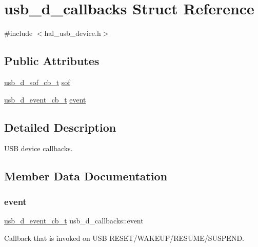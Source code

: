 \hypertarget{structusb__d__callbacks}{}\section{usb\+\_\+d\+\_\+callbacks Struct Reference}
\label{structusb__d__callbacks}


{\ttfamily \#include $<$hal\+\_\+usb\+\_\+device.\+h$>$}

\subsection*{Public Attributes}
\begin{DoxyCompactItemize}
\item 
\hyperlink{group__doc__driver__hal__usb__device_gaad808712d16d588e66167b3719c521ec}{usb\+\_\+d\+\_\+sof\+\_\+cb\+\_\+t} \hyperlink{structusb__d__callbacks_a01a45267cb31926de90e0332f3beb375}{sof}
\item 
\hyperlink{group__doc__driver__hal__usb__device_ga4bcb7ee43d9f4fe37c0e5ac05ed083d4}{usb\+\_\+d\+\_\+event\+\_\+cb\+\_\+t} \hyperlink{structusb__d__callbacks_a131549fe264fa0d91746306ad5019344}{event}
\end{DoxyCompactItemize}


\subsection{Detailed Description}
U\+SB device callbacks. 

\subsection{Member Data Documentation}
\mbox{\label{structusb__d__callbacks_a131549fe264fa0d91746306ad5019344}} 
\subsubsection{\texorpdfstring{event}{event}}
{\footnotesize\ttfamily \hyperlink{group__doc__driver__hal__usb__device_ga4bcb7ee43d9f4fe37c0e5ac05ed083d4}{usb\+\_\+d\+\_\+event\+\_\+cb\+\_\+t} usb\+\_\+d\+\_\+callbacks\+::event}

Callback that is invoked on U\+SB R\+E\+S\+E\+T/\+W\+A\+K\+E\+U\+P/\+R\+E\+S\+U\+M\+E/\+S\+U\+S\+P\+E\+ND. \mbox{\label{structusb__d__callbacks_a01a45267cb31926de90e0332f3beb375}} 
